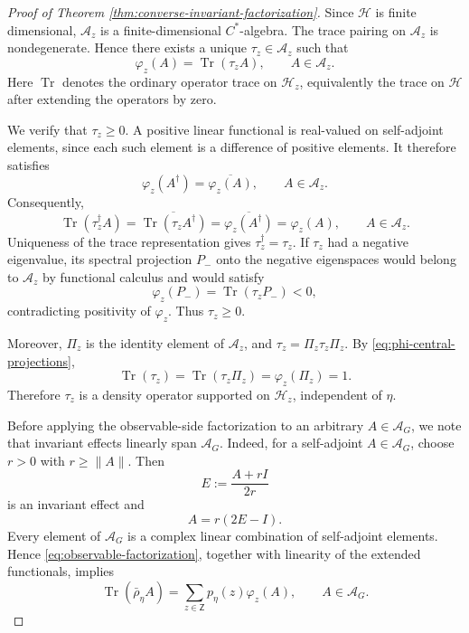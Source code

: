 \documentclass{article}
\theoremstyle{named}
\theoremstyle{named1}
\newcommand{\Tr}{\operatorname{Tr}}
\newcommand{\cA}{\mathcal A}
\newcommand{\cH}{\mathcal H}
\theoremstyle{plain}
\theoremstyle{remark}
\begin{document}
\begin{proof}[Proof of Theorem \ref{thm:converse-invariant-factorization}]
Since $\cH$ is finite dimensional, $\cA_z$ is a
finite-dimensional $C^*$-algebra. The trace pairing on
$\cA_z$ is nondegenerate.
Hence there exists
a unique $\tau_z\in\cA_z$ such that
\[
    \varphi_z(A)
    =
    \Tr(\tau_zA),
    \qquad A\in\cA_z.
\]
Here $\Tr$ denotes the ordinary operator trace on
$\cH_z$, equivalently the trace on $\cH$ after
extending the operators by zero.

We verify that $\tau_z\geq0$. A positive linear
functional is real-valued on self-adjoint elements,
since each such element is a difference of positive
elements. It therefore satisfies
\[
    \varphi_z(A^\dagger)
    =
    \overline{\varphi_z(A)},
    \qquad A\in\cA_z.
\]
Consequently,
\[
    \Tr(\tau_z^\dagger A)
    =
    \overline{\Tr(\tau_zA^\dagger)}
    =
    \overline{\varphi_z(A^\dagger)}
    =
    \varphi_z(A),
    \qquad A\in\cA_z.
\]
Uniqueness of the trace representation gives
$\tau_z^\dagger=\tau_z$. If $\tau_z$ had a negative
eigenvalue, its spectral projection $P_-$ onto the
negative eigenspaces would belong to $\cA_z$ by functional calculus and would satisfy
\[
    \varphi_z(P_-)
    =
    \Tr(\tau_zP_-)
    <
    0,
\]
contradicting positivity of $\varphi_z$. Thus
$\tau_z\geq0$.

Moreover, $\Pi_z$ is the identity element of $\cA_z$,
and $\tau_z=\Pi_z\tau_z\Pi_z$. By
\eqref{eq:phi-central-projections},
\[
    \Tr(\tau_z)
    =
    \Tr(\tau_z\Pi_z)
    =
    \varphi_z(\Pi_z)
    =
    1.
\]
Therefore $\tau_z$ is a density operator supported on
$\cH_z$, independent of $\eta$.

Before applying the observable-side factorization to
an arbitrary $A\in\cA_G$, we note that invariant
effects linearly span $\cA_G$. Indeed, for a
self-adjoint $A\in\cA_G$, choose $r>0$ with
$r\geq\|A\|$. Then
\[
    E:=\frac{A+rI}{2r}
\]
is an invariant effect and
\[
    A=r(2E-I).
\]
Every element of $\cA_G$ is a complex linear
combination of self-adjoint elements. Hence
\eqref{eq:observable-factorization}, together with
linearity of the extended functionals, implies
\[
    \Tr(\bar\rho_\eta A)
    =
    \sum_{z\in\mathsf Z}
    p_\eta(z)\varphi_z(A),
    \qquad A\in\cA_G.
\]


\end{proof}
\end{document}
